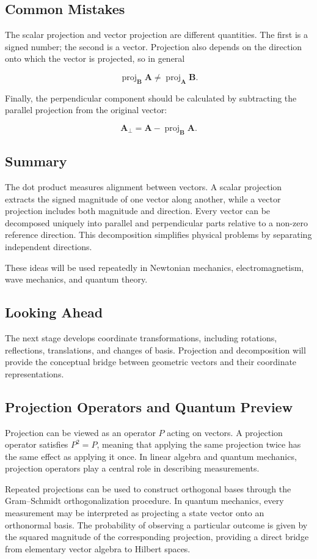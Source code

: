 \subsection{Common Mistakes}

The scalar projection and vector projection are different quantities. The first
is a signed number; the second is a vector. Projection also depends on the
direction onto which the vector is projected, so in general

\[
\operatorname{proj}_{\mathbf B}\mathbf A
\neq
\operatorname{proj}_{\mathbf A}\mathbf B.
\]

Finally, the perpendicular component should be calculated by subtracting the
parallel projection from the original vector:

\[
\mathbf A_{\perp}
=
\mathbf A-\operatorname{proj}_{\mathbf B}\mathbf A.
\]

\subsection{Summary}

The dot product measures alignment between vectors. A scalar projection extracts
the signed magnitude of one vector along another, while a vector projection
includes both magnitude and direction. Every vector can be decomposed uniquely
into parallel and perpendicular parts relative to a non-zero reference
direction. This decomposition simplifies physical problems by separating
independent directions.

These ideas will be used repeatedly in Newtonian mechanics, electromagnetism,
wave mechanics, and quantum theory.

\subsection*{Looking Ahead}

The next stage develops coordinate transformations, including rotations,
reflections, translations, and changes of basis. Projection and decomposition
will provide the conceptual bridge between geometric vectors and their
coordinate representations.


\subsection*{Projection Operators and Quantum Preview}
Projection can be viewed as an operator $P$ acting on vectors. A projection operator satisfies $P^2=P$, meaning that applying the same projection twice has the same effect as applying it once. In linear algebra and quantum mechanics, projection operators play a central role in describing measurements.

Repeated projections can be used to construct orthogonal bases through the Gram--Schmidt orthogonalization procedure. In quantum mechanics, every measurement may be interpreted as projecting a state vector onto an orthonormal basis. The probability of observing a particular outcome is given by the squared magnitude of the corresponding projection, providing a direct bridge from elementary vector algebra to Hilbert spaces.
